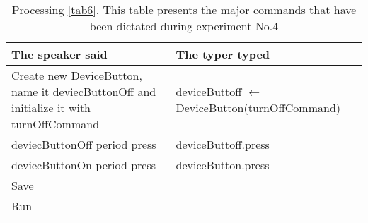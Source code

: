 \begin{table}[H]
	\begin{tabular}{|p{10cm}|p{6cm}|}
		\hline
		\rowcolor[HTML]{9B9B9B} 
		{\color[HTML]{000000} The speaker said} & {\color[HTML]{000000} The typer typed} \\ \hline
		Create new DeviceButton, name it deviecButtonOff and initialize it with turnOffCommand & deviceButtoff $\leftarrow$ DeviceButton(turnOffCommand) \\ \hline
		deviecButtonOff period press & deviceButtoff.press \\ \hline
		deviecButtonOn period press & deviceButton.press \\ \hline
		Save & \\ \hline
		Run & \\ \hline
	\end{tabular}
	\caption{Processing \autoref{tab6}. This table presents the major commands that have been dictated during experiment No.4}
	\label{tab7}
\end{table}
